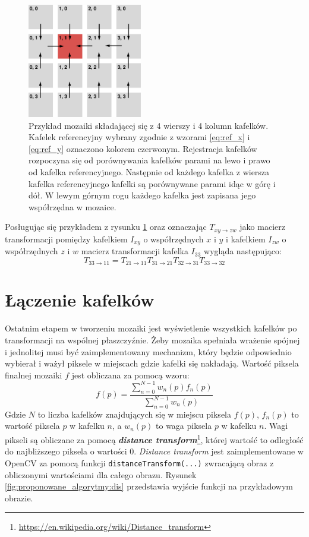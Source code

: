 \begin{figure}[H]
  \centering
  \includegraphics[width=5cm]{gfx/global_registration}
  \caption{Przykład mozaiki składającej się z 4 wierszy i 4 kolumn kafelków. Kafelek referencyjny wybrany zgodnie z wzorami \ref{eq:ref_x} i \ref{eq:ref_y} oznaczono kolorem czerwonym. Rejestracja kafelków rozpoczyna się od porównywania kafelków parami na lewo i prawo od kafelka referencyjnego. Następnie od każdego kafelka z wiersza kafelka referencyjnego kafelki są porównywane parami idąc w górę i dół. W lewym górnym rogu każdego kafelka jest zapisana jego współrzędna w mozaice.}
  \label{fig:proponowane_algorytmy:global_registration}
\end{figure}

Posługując się przykładem z rysunku \ref{fig:proponowane_algorytmy:global_registration} oraz oznaczając $T_{xy\rightarrow zw}$ jako macierz transformacji pomiędzy kafelkiem $I_{xy}$ o współrzędnych $x$ i $y$ i kafelkiem $I_{zw}$ o współrzędnych $z$ i $w$ macierz transformacji kafelka $I_{33}$ wygląda następująco:
\begin{equation}
T_{33\rightarrow 11} = T_{21\rightarrow 11}T_{31\rightarrow 21}T_{32\rightarrow 31}T_{33\rightarrow 32}
\end{equation}
\section{Łączenie kafelków}
\label{sec:proponowane_algorytmy:laczenie_kafelkow}

Ostatnim etapem w tworzeniu mozaiki jest wyświetlenie wszystkich kafelków po transformacji na wspólnej płaszczyźnie. Żeby mozaika spełniała wrażenie spójnej i jednolitej musi być zaimplementowany mechanizm, który będzie odpowiednio wybierał i ważył piksele w miejscach gdzie kafelki się nakładają. Wartość piksela finalnej mozaiki $f$ jest obliczana za pomocą wzoru:
\begin{equation}
f(p) = \frac{\sum_{n = 0}^{N - 1} w_n(p)f_n(p)}{\sum_{n = 0}^{N - 1} w_n(p)}
\end{equation}
Gdzie $N$ to liczba kafelków znajdujących się w miejscu piksela $f(p)$, $f_n(p)$ to wartość piksela $p$ w kafelku $n$, a $w_n(p)$ to waga piksela $p$ w kafelku $n$. Wagi pikseli są obliczane za pomocą \textbf{\textit{distance transform}}\footnote{\url{https://en.wikipedia.org/wiki/Distance_transform}}, której wartość to odległość do najbliższego piksela o wartości 0. \textit{Distance transform} jest zaimplementowane w OpenCV za pomocą funkcji \texttt{distanceTransform(...)} zwracającą obraz z obliczonymi wartościami dla całego obrazu. Rysunek \ref{fig:proponowane_algorytmy:dis} przedstawia wyjście funkcji na przykładowym obrazie.

